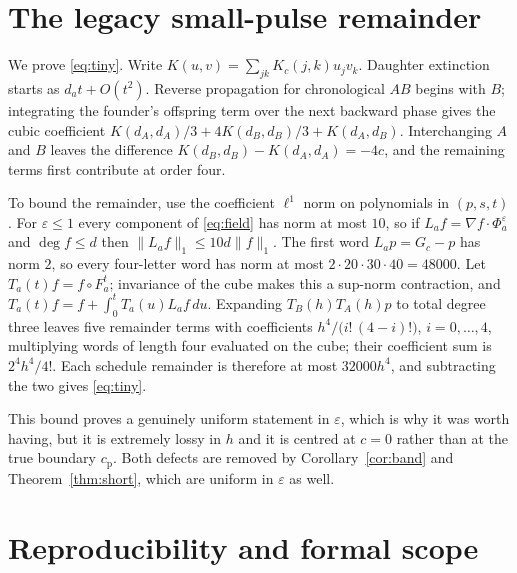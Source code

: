 \documentclass[11pt]{article}
\theoremstyle{plain}
\theoremstyle{definition}
\theoremstyle{remark}
\newcommand{\eps}{\varepsilon}
\newcommand{\cp}{c_{\mathrm p}}
\begin{document}
\section{The legacy small-pulse remainder}\label{app:tiny}

We prove \eqref{eq:tiny}. Write $K(u,v)=\sum_{jk}K_c(j,k)u_jv_k$. Daughter
extinction starts as $d_at+O(t^2)$. Reverse propagation for chronological $AB$
begins with $B$; integrating the founder's offspring term over the next
backward phase gives the cubic coefficient
$K(d_A,d_A)/3+4K(d_B,d_B)/3+K(d_A,d_B)$. Interchanging $A$ and $B$ leaves the
difference $K(d_B,d_B)-K(d_A,d_A)=-4c$, and the remaining terms first contribute
at order four.

To bound the remainder, use the coefficient $\ell^1$ norm on polynomials in
$(p,s,t)$. For $\eps\le1$ every component of \eqref{eq:field} has norm at most
$10$, so if $L_af=\nabla f\cdot\Phi_a^\eps$ and $\deg f\le d$ then
$\|L_af\|_1\le10d\|f\|_1$. The first word $L_ap=G_c-p$ has norm $2$, so every
four-letter word has norm at most $2\cdot20\cdot30\cdot40=48000$. Let
$T_a(t)f=f\circ F_a^t$; invariance of the cube makes this a sup-norm
contraction, and $T_a(t)f=f+\int_0^tT_a(u)L_af\,du$. Expanding
$T_B(h)T_A(h)p$ to total degree three leaves five remainder terms with
coefficients $h^4/\bigl(i!\,(4-i)!\bigr)$, $i=0,\dots,4$, multiplying words of
length four evaluated on the cube; their coefficient sum is $2^4h^4/4!$. Each
schedule remainder is therefore at most $32000h^4$, and subtracting the two
gives \eqref{eq:tiny}.

This bound proves a genuinely uniform statement in $\eps$, which is why it was
worth having, but it is extremely lossy in $h$ and it is centred at $c=0$
rather than at the true boundary $\cp$. Both defects are removed by
Corollary~\ref{cor:band} and Theorem~\ref{thm:short}, which are uniform in
$\eps$ as well.

\section{Reproducibility and formal scope}\label{app:repro}
\end{document}

